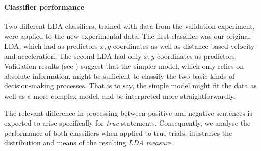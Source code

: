 \documentclass{article}
\begin{document}

\paragraph{Classifier performance}
Two different LDA classifiers, trained with data from the validation experiment, were applied to the new experimental data. The first classifier was our original LDA, which had as predictors $x,y$ coordinates as well as distance-based velocity and acceleration. The second LDA had only $x,y$ coordinates as predictors. Validation results (see ) suggest that the simpler model, which only relies on absolute information, might be sufficient to classify the two basic kinds of decision-making processes. That is to say, the simple model might fit the data as well as a more complex model, and be interpreted more straightforwardly. 

The relevant difference in processing between positive and negative sentences is expected to arise specifically for \emph{true} statements. Consequently, we analyse the performance of both classifiers when applied to true trials.  illustrates the distribution and means of the resulting \textit{LDA measure}. 
\end{document}
